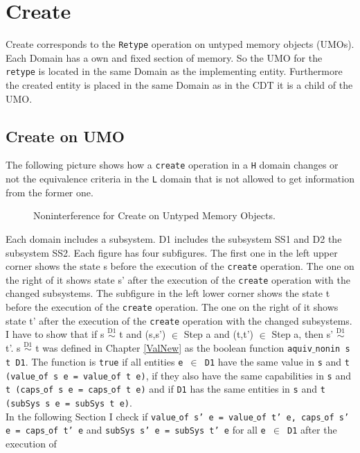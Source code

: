 \section{Create}\label{sec:Create}
Create corresponds to the \texttt{Retype} operation on untyped memory objects (UMOs). Each Domain has a own and fixed section of memory. So the UMO for the \texttt{retype} is located in the same Domain as the implementing entity. Furthermore the created entity is placed in the same Domain as in the CDT it is a child of the UMO.  
\subsection{Create on UMO}
The following picture shows how a \texttt{create} operation in a \texttt{H} domain changes or not the equivalence criteria in the \texttt{L} domain that is not allowed to get information from the former one. 
\begin{figure}[H]
\caption{Noninterference for Create on Untyped Memory Objects.}
\end{figure}
Each domain includes a subsystem. D1 includes the subsystem SS1 and D2 the subsystem SS2. Each figure has four subfigures. The first one in the left upper corner shows the state s before the execution of the \texttt{create} operation. The one on the right of it shows state s' after the execution of the \texttt{create} operation with the changed subsystems. The subfigure in the left lower corner shows the state t before the execution of the \texttt{create} operation. The one on the right of it shows state t' after the execution of the \texttt{create} operation with the changed subsystems.\\
I have to show that if s $\overset{\text{D1}}{\sim}$ t and (s,s') $\in$ Step a and (t,t') $\in$ Step a, then s' $\overset{\text{D1}}{\sim}$ t'. 
s $\overset{\text{D1}}{\sim}$ t was defined in Chapter \ref{ValNew} as the boolean function \texttt{aquiv$\_$nonin s t D1}. The function is \texttt{true} if all entities \texttt{e $\in$ D1} have the same value in \texttt{s} and \texttt{t (value$\_$of s e = value$\_$of t e)}, if they also have the same capabilities in \texttt{s} and \texttt{t (caps$\_$of s e = caps$\_$of t e)} and if \texttt{D1} has the same entities in \texttt{s} and \texttt{t (subSys s e = subSys t e)}.\\
In the following Section I check if \texttt{value$\_$of s' e = value$\_$of t' e, caps$\_$of s' e = caps$\_$of t’ e} and \texttt{subSys s' e = subSys t' e} for all \texttt{e $\in$ D1} after the execution of 
